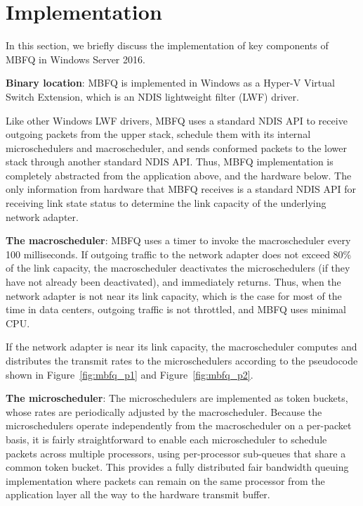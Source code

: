 \section{Implementation}
\label{sec:implementation}
In this section, we briefly discuss the implementation of key components of MBFQ in Windows
Server 2016.

{\bf Binary location}: MBFQ is implemented in Windows as a Hyper-V Virtual Switch Extension, 
which is an NDIS lightweight filter (LWF) driver.

Like other Windows LWF drivers, MBFQ uses a standard NDIS API to receive outgoing packets
from the upper stack, schedule them with its internal microschedulers and macroscheduler, and 
sends conformed packets to the lower stack through another standard NDIS API.
Thus, MBFQ implementation is completely abstracted from the application above, and the 
hardware below.  The only information from hardware that MBFQ receives is a standard NDIS API 
for receiving link state status to determine the link capacity of the underlying network adapter.

{\bf The macroscheduler}: MBFQ uses a timer to invoke the macroscheduler every 100 milliseconds.
If outgoing traffic to the network adapter does not exceed 80\% of the link capacity, the
macroscheduler deactivates the microschedulers (if they have not already been deactivated), and
immediately returns.  Thus, when the network adapter is not near its link capacity, which is the case
for most of the time in data centers, outgoing traffic is not throttled, and MBFQ uses minimal CPU.

If the network adapter is near its link capacity, the macroscheduler computes and distributes the
transmit rates to the microschedulers according to the pseudocode shown in  
Figure~\ref{fig:mbfq_p1} and Figure~\ref{fig:mbfq_p2}.

{\bf The microscheduler}: The microschedulers are implemented as token buckets, whose rates are
periodically adjusted by the macroscheduler. Because the microschedulers operate independently from
the macroscheduler on a per-packet basis, it is fairly straightforward to enable each microscheduler to 
schedule packets across multiple processors, using per-processor sub-queues that share a common 
token bucket. This provides a fully distributed fair bandwidth queuing implementation where packets can remain
on the same processor from the application layer all the way to the hardware transmit buffer.


